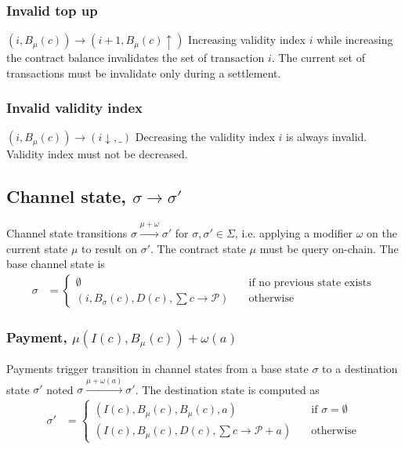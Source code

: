 \documentclass{llncs}
\begin{document}
\subsubsection{Invalid top up} $(i, B_\mu(c)) \rightarrow (i+1, B_\mu(c)\uparrow)$ Increasing validity index $i$ while increasing the contract balance invalidates the set of transaction $i$. The current set of transactions must be invalidate only during a settlement.

\subsubsection{Invalid validity index} $(i, B_\mu(c)) \rightarrow (i\downarrow, \_)$ Decreasing the validity index $i$ is always invalid. Validity index must not be decreased.

\subsection{Channel state, $\sigma \rightarrow \sigma'$} Channel state transitions $\sigma \xrightarrow{\mu + \omega} \sigma'$ for $\sigma, \sigma' \in \Sigma$, i.e. applying a modifier $\omega$ on the current state $\mu$ to result on $\sigma'$. The contract state $\mu$ must be query on-chain. The base channel state is
\begin{equation*}
\begin{split}
  \sigma &=
  \begin{cases}
    \emptyset & \quad \text{if no previous state exists} \\
    (i, B_\sigma(c), D(c), \textstyle \sum c \rightarrow \mathcal{P}) & \quad \text{otherwise}
  \end{cases}
\end{split}
\end{equation*}

\subsubsection{Payment, $\mu(I(c), B_\mu(c))+\omega(a)$} Payments trigger transition in channel states from a base state $\sigma$ to a destination state $\sigma'$ noted $\sigma \xrightarrow{\mu + \omega(a)} \sigma'$.
The destination state is computed as
\begin{equation*}
\begin{split}
  \sigma' &=
  \begin{cases}
      (I(c), B_\mu(c), B_\mu(c), a) & \quad \text{if } \sigma = \emptyset \\
      (I(c), B_\mu(c), D(c), \textstyle \sum c \rightarrow \mathcal{P}+a) & \quad \text{otherwise}
  \end{cases}
\end{split}
\end{equation*}
\end{document}
